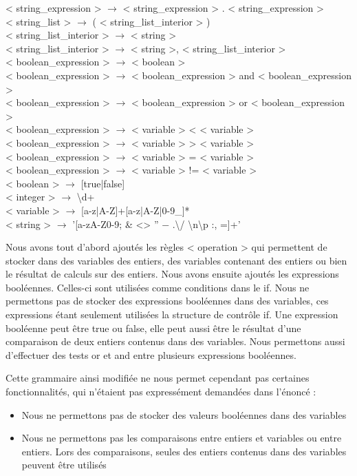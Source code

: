 \documentclass[a4paper,10pt]{article}
\begin{document}
{< string\_expression > $\rightarrow$ < string\_expression > . < string\_expression > \\
< string\_list > $\rightarrow$ ( < string\_list\_interior > ) \\
< string\_list\_interior > $\rightarrow$ < string >\\
< string\_list\_interior > $\rightarrow$ < string >, < string\_list\_interior > \\
< boolean\_expression > $\rightarrow$ < boolean > \\
< boolean\_expression > $\rightarrow$ < boolean\_expression > and < boolean\_expression > \\
< boolean\_expression > $\rightarrow$ < boolean\_expression > or < boolean\_expression > \\
< boolean\_expression > $\rightarrow$ < variable > < < variable >\\
< boolean\_expression > $\rightarrow$ < variable > > < variable >\\
< boolean\_expression > $\rightarrow$ < variable > = < variable >\\
< boolean\_expression > $\rightarrow$ < variable > != < variable >\\
< boolean > $\rightarrow$ [true|false]\\
< integer > $\rightarrow$ \textbackslash d+\\
< variable > $\rightarrow$ [a-z|A-Z]+[a-z|A-Z|0-9\_]*\\
< string > $\rightarrow$ '[a-zA-Z0-9; \& <> ” − .\textbackslash / \textbackslash n\textbackslash p :, =]+' \\
}

Nous avons tout d'abord ajoutés les règles < operation > qui permettent de stocker dans des variables des entiers, des variables contenant des entiers ou bien le résultat
de calculs sur des entiers. Nous avons ensuite ajoutés les expressions booléennes. Celles-ci sont utilisées comme conditions dans 
le \textrm{if}. Nous ne permettons pas de stocker des expressions booléennes dans des variables, ces expressions étant seulement utilisées la structure de contrôle \textrm{if}. 
Une expression booléenne peut être \textrm{true} ou \textrm{false}, elle peut aussi être le résultat d'une comparaison de deux entiers contenus dans des variables. Nous permettons
aussi d'effectuer des tests \textrm{or} et \textrm{and} entre plusieurs expressions booléennes.

Cette grammaire ainsi modifiée ne nous permet cependant pas certaines fonctionnalités, qui n'étaient pas expressément demandées dans l'énoncé :
\begin{itemize}
 \item Nous ne permettons pas de stocker des valeurs booléennes dans des variables
 \item Nous ne permettons pas les comparaisons entre entiers et variables ou entre entiers. Lors des comparaisons, seules des entiers contenus dans des variables
 peuvent être utilisés
\end{itemize}
\end{document}
